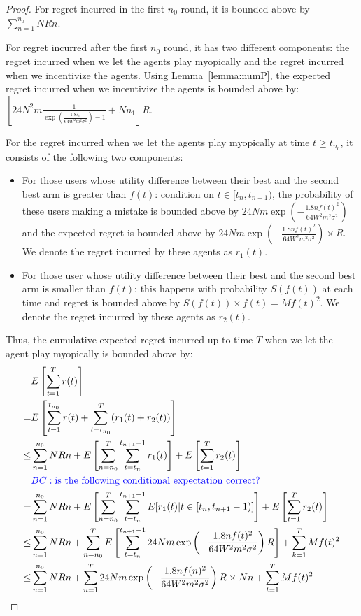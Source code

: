 \documentclass{article}
\newcommand{\bccomment}[1]{{\color{blue}BC: #1}}
\begin{document}
\begin{proof}
For regret incurred in the first $n_0$ round, it is bounded above by $\sum_{n=1}^{n_{0}}NRn$.

For regret incurred after the first $n_0$ round, it has two different components: the regret incurred when we let the agents play myopically and the regret incurred when we incentivize the agents. Using Lemma~\ref{lemma:numP}, the expected regret incurred when we incentivize the agents is bounded above by: $\left[24N^2 m \frac{1}{\exp(\frac{1.8\delta_{0}}{64W^2 m^2\sigma^2})-1} + Nn_1\right]R$.

For the regret incurred when we let the agents play myopically at time $t\geq t_{n_0}$, it consists of the following two components:
\begin{itemize}
\item For those users whose utility difference between their best and the second best arm is greater than $f(t)$: condition on $t\in [t_n,t_{n+1})$, the probability of these users making a mistake is bounded above by $24Nm\exp\left(-\frac{1.8n f(t)^2}{64 W^2 m^2\sigma^2}\right)$ and the expected regret is bounded above by $24Nm\exp\left(-\frac{1.8n f(t)^2}{64 W^2 m^2\sigma^2}\right)\times R$. We denote the regret incurred by these agents as $r_1(t)$.
\item For those user whose utility difference between their best and the second best arm is smaller than $f(t)$: this happens with probability $S(f(t))$ at each time and regret is bounded above by $S(f(t)) \times f(t)=Mf(t)^2$. We denote the regret incurred by these agents as $r_2(t)$.
\end{itemize}

Thus, the cumulative expected regret incurred up to time $T$ when we let the agent play myopically is bounded above by:
\begin{align}
&E\left[\sum_{t=1}^{T}r(t)\right] \nonumber \\
=&E\left[\sum_{t=1}^{t_{n_{0}}} r(t) + \sum_{t=t_{n_{0}}}^{T}(r_1(t)+r_2(t))\right]  \nonumber \\
\leq & \sum_{n=1}^{n_{0}}NRn + E\left[\sum_{n=n_{0}}^{T}\sum_{t=t_{n}}^{t_{n+1}-1}r_1(t)\right]+ E\left[\sum_{t=1}^{T}r_2(t)\right] \nonumber \\
&\bccomment{\text{is the following conditional expectation correct?}} \nonumber \\
= & \sum_{n=1}^{n_{0}}NRn + E\left[\sum_{n=n_{0}}^{T}\sum_{t=t_{n}}^{t_{n+1}-1}E[r_1(t)|t\in [t_n,t_{n+1}-1)]\right]+ E\left[\sum_{t=1}^{T}r_2(t)\right] \nonumber \\
\leq & \sum_{n=1}^{n_{0}}NRn + \sum_{n=n_{0}}^{T}E\left[\sum_{t=t_{n}}^{t_{n+1}-1}24Nm\exp\left(-\frac{1.8n f(t)^2}{64 W^2 m^2\sigma^2}\right) R\right]+ \sum_{k=1}^{T}Mf(t)^2 \nonumber \\
\leq & \sum_{n=1}^{n_{0}}NRn + \sum_{n=1}^{T} 24Nm\exp\left(-\frac{1.8n f(n)^2}{64 W^2 m^2\sigma^2}\right) R \times Nn+ \sum_{t=1}^{T}Mf(t)^2 \label{equ:regret}
\end{align}


\end{proof}
\end{document}
